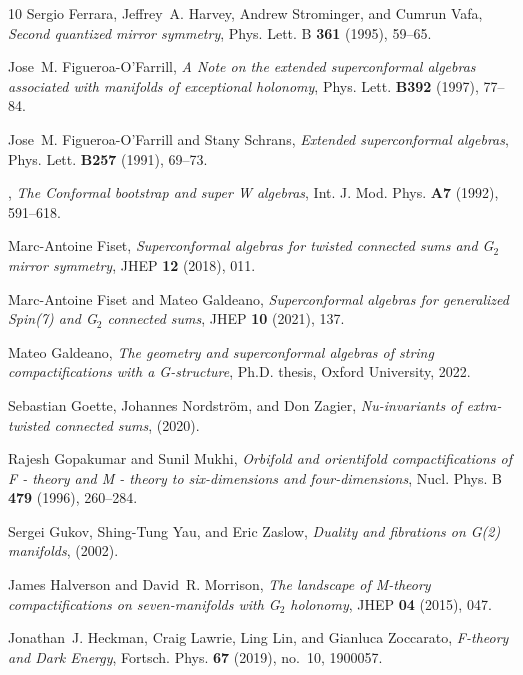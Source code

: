 \documentclass{pspum-l}
\theoremstyle{definition}
\theoremstyle{remark}
\numberwithin{equation}{section}
\begin{document}
\begin{thebibliography}{10}
Sergio Ferrara, Jeffrey~A. Harvey, Andrew Strominger, and Cumrun Vafa,
  \emph{{Second quantized mirror symmetry}}, Phys. Lett. B \textbf{361} (1995),
  59--65.

Jose~M. Figueroa-O'Farrill, \emph{{A Note on the extended superconformal
  algebras associated with manifolds of exceptional holonomy}}, Phys. Lett.
  \textbf{B392} (1997), 77--84.

Jose~M. Figueroa-O'Farrill and Stany Schrans, \emph{{Extended superconformal
  algebras}}, Phys. Lett. \textbf{B257} (1991), 69--73.

\bysame, \emph{{The Conformal bootstrap and super W algebras}}, Int. J. Mod.
  Phys. \textbf{A7} (1992), 591--618.

Marc-Antoine Fiset, \emph{{Superconformal algebras for twisted connected sums
  and G$_{2}$ mirror symmetry}}, JHEP \textbf{12} (2018), 011.

Marc-Antoine Fiset and Mateo Galdeano, \emph{{Superconformal algebras for
  generalized Spin(7) and G$_{2}$ connected sums}}, JHEP \textbf{10} (2021),
  137.

Mateo Galdeano, \emph{{The geometry and superconformal algebras of string
  compactifications with a G-structure}}, Ph.D. thesis, Oxford University,
  2022.

Sebastian Goette, Johannes Nordstr\"om, and Don Zagier, \emph{Nu-invariants of
  extra-twisted connected sums},  (2020).

Rajesh Gopakumar and Sunil Mukhi, \emph{{Orbifold and orientifold
  compactifications of F - theory and M - theory to six-dimensions and
  four-dimensions}}, Nucl. Phys. B \textbf{479} (1996), 260--284.

Sergei Gukov, Shing-Tung Yau, and Eric Zaslow, \emph{{Duality and fibrations on
  G(2) manifolds}},  (2002).

James Halverson and David~R. Morrison, \emph{{The landscape of M-theory
  compactifications on seven-manifolds with G$_{2}$ holonomy}}, JHEP
  \textbf{04} (2015), 047.

Jonathan~J. Heckman, Craig Lawrie, Ling Lin, and Gianluca Zoccarato,
  \emph{{F-theory and Dark Energy}}, Fortsch. Phys. \textbf{67} (2019), no.~10,
  1900057.


\end{thebibliography}
\end{document}
